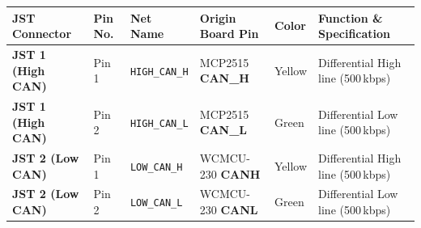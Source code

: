 \documentclass[10pt,a4paper]{article}
\begin{document}
\vspace{-8pt}

\begin{tcolorbox}[bwcard, title={5. CAN Bus JST Connector Pinouts (Two 2-Pin JST Ports)}]
\begin{tabularx}{\textwidth}{@{} L{3.6cm} C{1.8cm} L{2.6cm} L{3.5cm} C{1.6cm} Y @{}}
\toprule
\textbf{JST Connector} & \textbf{Pin No.} & \textbf{Net Name} & \textbf{Origin Board Pin} & \textbf{Color} & \textbf{Function \& Specification} \\
\midrule
\textbf{JST 1 (High CAN)} & Pin 1 & \texttt{HIGH\_CAN\_H} & MCP2515 \textbf{CAN\_H} & Yellow & Differential High line (500\,kbps) \\
\textbf{JST 1 (High CAN)} & Pin 2 & \texttt{HIGH\_CAN\_L} & MCP2515 \textbf{CAN\_L} & Green & Differential Low line (500\,kbps) \\
\midrule
\textbf{JST 2 (Low CAN)} & Pin 1 & \texttt{LOW\_CAN\_H} & WCMCU-230 \textbf{CANH} & Yellow & Differential High line (500\,kbps) \\
\textbf{JST 2 (Low CAN)} & Pin 2 & \texttt{LOW\_CAN\_L} & WCMCU-230 \textbf{CANL} & Green & Differential Low line (500\,kbps) \\
\bottomrule
\end{tabularx}
\end{tcolorbox}
\end{document}
